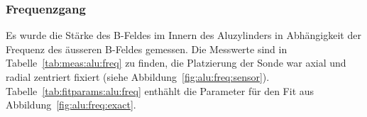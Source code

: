 

{%
    \clearpage
    \pdfpagewidth
	\textwidth
    \addtolength{\textwidth}{70mm}


    \subsubsection{Frequenzgang}
    \label{sec:ausw:subsec:hohlz:subsubsec:steel}

	\begin{minipage}[t]{0.33\textwidth}
        \vspace{0pt}
        Es  wurde  die  St\"arke  des  B-Feldes  im  Innern  des  Aluzylinders
        in    Abh\"angigkeit   der    Frequenz    des   \"ausseren    B-Feldes
        gemessen. Die   Messwerte   sind  in   Tabelle~\ref{tab:meas:alu:freq}
        zu  finden,   die  Platzierung   der  Sonde   war  axial   und  radial
        zentriert    fixiert   (siehe    Abbildung~\ref{fig:alu:freq:sensor}).
        Tabelle~\ref{tab:fitparams:alu:freq}  enth\"ahlt  die Parameter  f\"ur
        den Fit aus Abbildung~\ref{fig:alu:freq:exact}.


\end{minipage}}
